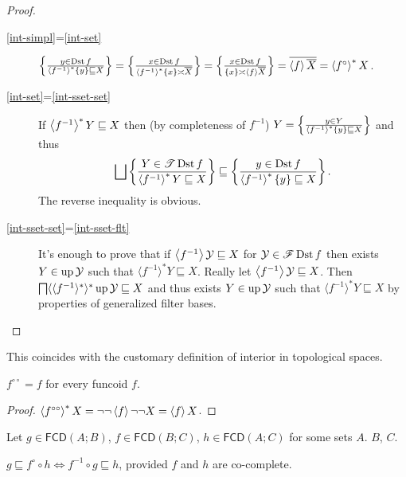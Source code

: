 \begin{proof}
  ~
  \begin{description}
    \item[\ref{int-simpl}=\ref{int-set}] $\left\{ \frac{ y \in \operatorname{Dst} f }{
    \left\langle f^{- 1}\right\rangle ^{\ast} \{ y \} \sqsubseteq X }\right\} = \left\{ \frac{ x \in
    \operatorname{Dst} f }{ \left\langle f^{- 1}\right\rangle ^{\ast} \{
    x \} \asymp \overline{X} }\right\} = \left\{ \frac{ x \in \operatorname{Dst} f
    }{ \{ x \} \asymp \left\langle f\right\rangle
    \overline{X} }\right\} = \overline{\left\langle f\right\rangle \overline{X}} =
    \left\langle f^{\circ}\right\rangle ^{\ast} X$.
    
    \item[\ref{int-set}=\ref{int-sset-set}] If $\left\langle f^{- 1}\right\rangle ^{\ast} Y \sqsubseteq X$ then (by
    completeness of $f^{- 1}$) $Y = \left\{ \frac{ y \in Y }{
    \left\langle f^{- 1}\right\rangle ^{\ast} \{ y \} \sqsubseteq X }\right\}$ and thus
    \[ \bigsqcup \setcond{ Y \in \mathscr{T} \Dst f }
       { \rsupfun{f^{- 1}} Y \sqsubseteq X }
       \sqsubseteq \setcond{ y \in \Dst f }{
       \rsupfun{f^{- 1}} \{ y \} \sqsubseteq X } . \]
    The reverse inequality is obvious.
    
    \item[\ref{int-sset-set}=\ref{int-sset-flt}] It's enough to prove that if $\left\langle f^{- 1}\right\rangle
    \mathcal{Y} \sqsubseteq X$ for $\mathcal{Y} \in \mathscr{F} \operatorname{Dst} f$
    then exists $Y \in \operatorname{up} \mathcal{Y}$ such that $\langle f^{- 1}
    \rangle^{\ast} Y \sqsubseteq X$. Really let $\left\langle f^{- 1}\right\rangle
    \mathcal{Y} \sqsubseteq X$. Then $\bigsqcap \langle \langle f^{- 1}
    \rangle^{\ast} \rangle^{\ast} \operatorname{up} \mathcal{Y} \sqsubseteq X$ and
    thus exists $Y \in \operatorname{up} \mathcal{Y}$ such that $\langle f^{- 1}
    \rangle^{\ast} Y \sqsubseteq X$ by properties of generalized filter bases.
  \end{description}
\end{proof}

This coincides with the customary definition of interior in topological
spaces.

\begin{prop}
  $f^{\circ \circ} = f$ for every funcoid $f$.
\end{prop}

\begin{proof}
  $\left\langle f^{\circ\circ}\right\rangle ^{\ast} X = \neg \neg \left\langle f\right\rangle
  \neg \neg X = \left\langle f\right\rangle X$.
\end{proof}

\begin{prop}
  Let $g \in \mathsf{FCD} (A ; B)$, $f \in \mathsf{FCD} (B ;
  C)$, $h \in \mathsf{FCD} (A ; C)$ for some sets $A$. $B$, $C$.
  
  $g \sqsubseteq f^{\circ} \circ h \Leftrightarrow f^{- 1} \circ g \sqsubseteq
  h$, provided $f$ and $h$ are co-complete.
\end{prop}

